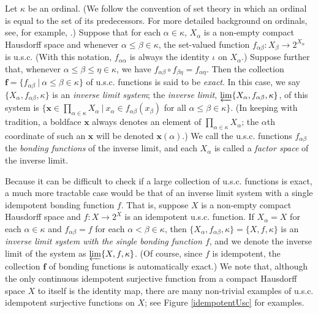 \documentclass{amsart}
\theoremstyle{definition}
\begin{document}
Let $\kappa$ be an ordinal. (We follow the convention of set theory in which an ordinal is equal to the set of its predecessors. For more detailed background on ordinals, see, for example, \cite{Kunen}.) Suppose that for each $\alpha \in \kappa$, $X_{\alpha}$ is a non-empty compact Hausdorff space and whenever $\alpha \le \beta \in \kappa$, the set-valued function $f_{\alpha \beta} : X_{\beta} \rightarrow 2^{X_{\alpha}}$ is u.s.c. (With this notation, $f_{\alpha \alpha}$ is always the identity $\iota$ on $X_{\alpha}$.) Suppose further that, whenever $\alpha \le \beta \le \eta \in \kappa$, we have $f_{\alpha \beta} \circ f_{\beta \eta} = f_{\alpha \eta}$. Then the collection $\textbf{f} = \{ f_{\alpha \beta} \ | \ \alpha \le \beta \in \kappa\}$ of u.s.c. functions is said to be \emph{exact}. In this case, we say $\{X_{\alpha}, f_{\alpha \beta}, \kappa\}$ is an \emph{inverse limit system}; the \emph{inverse limit}, $\varprojlim \{X_{\alpha}, f_{\alpha \beta}, \kappa\}$, of this system is $\{ \textbf{x} \in \prod_{\alpha \in \kappa} X_{\alpha} \ | \ x_{\alpha} \in f_{\alpha \beta}(x_{\beta})$ for all $\alpha \le \beta \in \kappa\}$. (In keeping with tradition, a boldface $\textbf{x}$ always denotes an element of $\prod_{\alpha \in \kappa} X_{\alpha}$; the $\alpha$th coordinate of such an $\textbf{x}$ will be denoted $\textbf{x}(\alpha)$.)  We call the u.s.c. functions $f_{\alpha \beta}$ the \emph{bonding functions} of the inverse limit, and each $X_{\alpha}$ is called a \emph{factor space} of the inverse limit.

Because it can be difficult to check if a large collection of u.s.c. functions is exact, a much more tractable case would be that of an inverse limit system with a single idempotent bonding function $f$. That is, suppose $X$ is a non-empty compact Hausdorff space and $f: X \rightarrow 2^{X}$ is an idempotent u.s.c. function. If $X_{\alpha} = X$ for each $\alpha \in \kappa$ and $f_{\alpha \beta} = f$ for each $\alpha < \beta \in \kappa$, then $\{X_{\alpha}, f_{\alpha \beta}, \kappa\} = \{X, f, \kappa\}$ is an \emph{inverse limit system with the single bonding function $f$}, and we denote the inverse limit of the system as $\varprojlim \{X, f, \kappa\}$. (Of course, since $f$ is idempotent, the collection $\textbf{f}$ of bonding functions is automatically exact.) We note that, although the only continuous idempotent surjective function from a compact Hausdorff space $X$ to itself is the identity map, there are many non-trivial examples of u.s.c. idempotent surjective functions on $X$; see Figure \ref{idempotentUsc} for examples.
\end{document}

